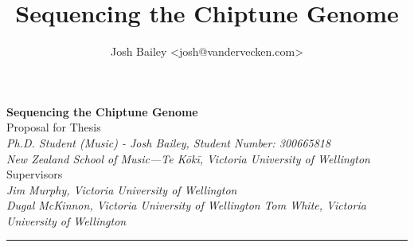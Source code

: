 \documentclass[10pt]{article}
\author{Josh Bailey <josh@vandervecken.com>}
\title{Sequencing the Chiptune Genome}
\begin{document}
        \begin{center}
          {\Large \textbf{Sequencing the Chiptune Genome}}\\
                \vspace{1em}
                Proposal for Thesis\\
                \vspace{1em}
                \textit{
                Ph.D. Student (Music) - Josh Bailey,
                Student Number: 300665818\\
                  New Zealand School of Music—Te Kōkī,
                  Victoria University of Wellington}\\
                \vspace{1em}
                Supervisors\\
                \vspace{1em}
                \textit{
                  Jim Murphy, Victoria University of Wellington\\
                  Dugal McKinnon, Victoria University of Wellington
                  Tom White, Victoria University of Wellington}\\
        \end{center}

        \begin{center}
                \rule{150mm}{0.2mm}
        \end{center}
\end{document}
